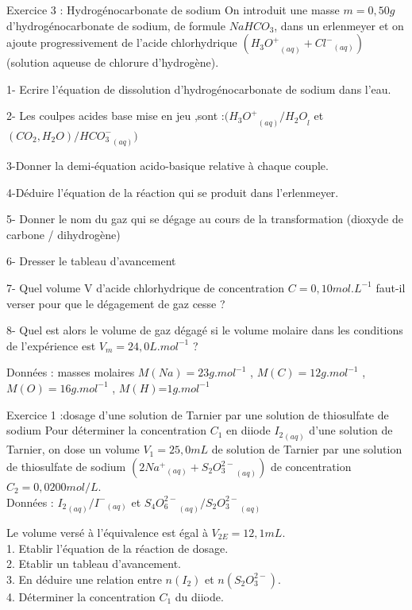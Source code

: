 \documentclass[12pt, french]{article}
\begin{document}
\begin{Box2}{Exercice 3 : Hydrogénocarbonate de sodium}
   On introduit une masse $m=0,50g$ d'hydrogénocarbonate de sodium, de formule $NaHCO_3$, dans un erlenmeyer et on ajoute progressivement de l'acide chlorhydrique $({H_3O^+}_{(aq)} + {Cl^-}_{(aq)})$ (solution aqueuse de chlorure d'hydrogène).

   1- Ecrire l’équation de dissolution d'hydrogénocarbonate de sodium dans l’eau.

   2- Les coulpes acides base mise en jeu ,sont :$({H_3O^+}_{(aq)}/{H_2O}_l $ et $(CO_2,H_2O)/{HCO_3^-}_{(aq)})$

   3-Donner la demi-équation acido-basique relative à chaque couple.

   4-Déduire l'équation de la réaction qui se produit dans l'erlenmeyer.

   5- Donner le nom du gaz qui se dégage au cours de la transformation (dioxyde de carbone /
dihydrogène)

   6- Dresser le tableau d’avancement

   7- Quel volume V d'acide chlorhydrique de concentration $C=0,10mol.L^{-1}$ faut-il verser pour que le
dégagement de gaz cesse ?

   8- Quel est alors le volume de gaz dégagé si le volume molaire dans les conditions de l'expérience est
   $V_m=24,0 L.mol^{-1}$ ?

   Données : masses molaires $M(Na) = 23 g.mol^{-1}$ , $M(C) = 12 g.mol^{-1}$ , $M(O) = 16 g.mol^{-1}$ , $M(H)$=$1 g.mol^{-1}$



\end{Box2}


   \begin{Box2}{Exercice 1 :dosage d'une solution de Tarnier par une solution de thiosulfate de sodium} 
      Pour déterminer la concentration $C_1$ en diiode ${I_2}_{(aq)}$ d’une solution de Tarnier, on dose un volume
      $V_1 =25,0 mL$ de solution de Tarnier par une solution de thiosulfate de sodium $(2{Na^+}_{(aq)} + {S_2O_3^{2-}}_{(aq)})$ de
concentration $C_2=0,0200 mol/L$.
      \\Données : ${I_2}_{(aq)} / {I^-}_{(aq)}$ et ${S_4O_6^{2-}}_{(aq)} / {S_2O_3^{2-}}_{(aq)}$

      Le volume versé à l’équivalence est égal à $V_{2E}=12,1 mL$.
\\1. Etablir l’équation de la réaction de dosage.
\\2. Etablir un tableau d’avancement.
      \\3. En déduire une relation entre $n(I_2)$ et $n(S_2O_3^{2-})$.
\\4. Déterminer la concentration $C_1$ du diiode.


   \end{Box2}
\end{document}
